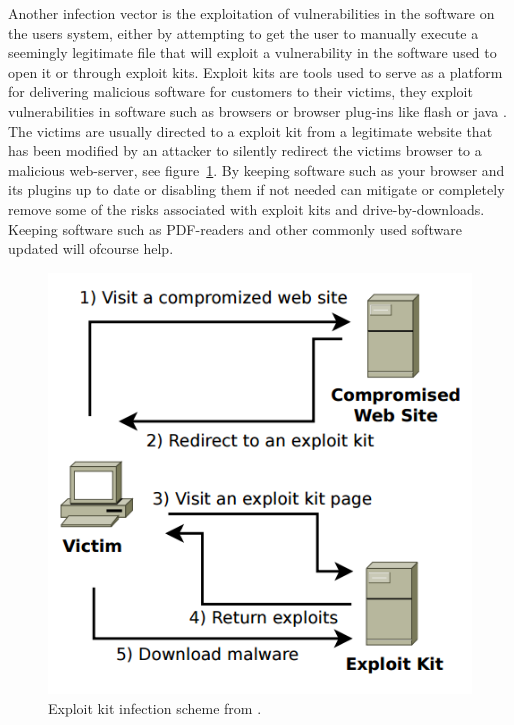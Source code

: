 Another infection vector is the exploitation of vulnerabilities in the software on the users system, either by attempting to get the user to manually execute a seemingly legitimate file that will exploit a vulnerability in the software used to open it or through exploit kits.
Exploit kits are tools used to serve as a platform for delivering malicious software for customers to their victims, they exploit vulnerabilities in software such as browsers or browser plug-ins like flash or java \cite{jan-kotov-ek}. The victims are usually directed to a exploit kit from a legitimate website that has been modified by an attacker to silently redirect the victims browser to a malicious web-server, see figure~\ref{jan-ek-infection}. By keeping software such as your browser and its plugins up to date or disabling them if not needed can mitigate or completely remove some of the risks associated with exploit kits and drive-by-downloads. Keeping software such as PDF-readers and other commonly used software updated will ofcourse help.


\begin{figure}
	\centering
	\includegraphics[scale=0.4]{fig/jan-ek-inf}
	\caption{Exploit kit infection scheme from \cite{jan-kotov-ek}.}
	\label{jan-ek-infection}
\end{figure}

